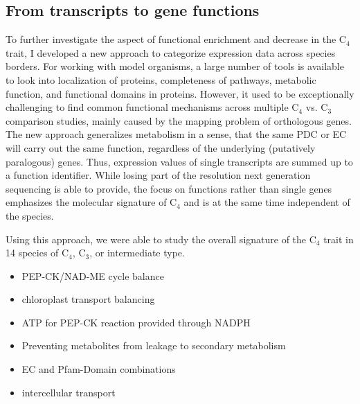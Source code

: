 \subsection{From transcripts to gene functions}
	To further investigate the aspect of functional enrichment and decrease in the C$_4$ trait, I developed a new approach to categorize expression data across species borders.
	For working with model organisms, a large number of tools is available to look into localization of proteins, completeness of pathways, metabolic function, and functional domains in proteins.
	However, it used to be exceptionally challenging to find common functional mechanisms across multiple C$_4$ vs. C$_3$ comparison studies, mainly caused by the mapping problem of orthologous genes.
	The new approach generalizes metabolism in a sense, that the same \ac{PDC} or \ac{EC} will carry out the same function, regardless of the underlying (putatively paralogous) genes.
	Thus, expression values of single transcripts are summed up to a function identifier.
	While losing part of the resolution next generation sequencing is able to provide, the focus on functions rather than single genes emphasizes the molecular signature of C$_4$ and is at the same time independent of the species.
	
	Using this approach, we were able to study the overall signature of the C$_4$ trait in 14 species of C$_4$, C$_3$, or intermediate type.
	
	
	\begin{itemize}
		\item PEP-CK/NAD-ME cycle balance
		\item chloroplast transport balancing
		\item ATP for PEP-CK reaction provided through NADPH
		\item Preventing metabolites from leakage to secondary metabolism
		\item EC and Pfam-Domain combinations
		\item intercellular transport
	\end{itemize}
		